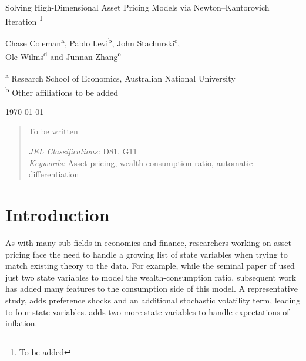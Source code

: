 \documentclass[12pt, reqno]{amsart}
\newcommand\blfootnote[1]{%
  \begingroup
  \renewcommand\thefootnote{}\footnote{#1}%
  \addtocounter{footnote}{-1}%
  \endgroup
}
\newcommand{\1}{\mathbbm 1}
\theoremstyle{plain}
\theoremstyle{definition}
\begin{document}
\title{}




\begin{center}
    \LARGE 
    Solving High-Dimensional Asset Pricing Models via Newton--Kantorovich
    Iteration
    \blfootnote{To be added}
 
    \vspace{1em}

    \large
    Chase Coleman\textsuperscript{a}, Pablo Levi\textsuperscript{b}, John
    Stachurski\textsuperscript{c}, \\ Ole Wilms\textsuperscript{d} and Junnan Zhang\textsuperscript{e} \par \bigskip

    \small
    \textsuperscript{a} Research School of Economics, Australian National University \\ 
    \textsuperscript{b} Other affiliations to be added  \\ \bigskip

    \normalsize
    \today
\end{center}


\begin{abstract}
    To be written
    \vspace{1em}

    \noindent
    \textit{JEL Classifications:} D81, G11 \\
    \textit{Keywords:} Asset pricing, wealth-consumption ratio, automatic differentiation
\end{abstract}





\maketitle


\section{Introduction}

As with many sub-fields in economics and finance, researchers working on asset
pricing face the need to handle a growing list of state variables when trying to
match existing theory to the data.  For example, while the seminal paper of
\cite{bansal2004risks} used just two state variables to model the
wealth-consumption ratio, subsequent work has added many features to the
consumption side of this model.  A representative study,
\cite{schorfheide2018identifying} adds preference shocks and an additional
stochastic volatility term, leading to four state variables.
\cite{gomez2021important} adds two more state variables to handle expectations
of inflation.  
\end{document}
